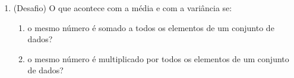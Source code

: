 \documentclass[a4paper]{article}
\begin{document}
\begin{enumerate}




\item (Desafio) O que acontece com a média e com a variância se:
  \begin{enumerate}
  \item o mesmo número é somado a todos os elementos de um conjunto de dados?
  \item o mesmo número é multiplicado por todos os elementos de um
    conjunto de dados?
  \end{enumerate}

\end{enumerate}
\end{document}
